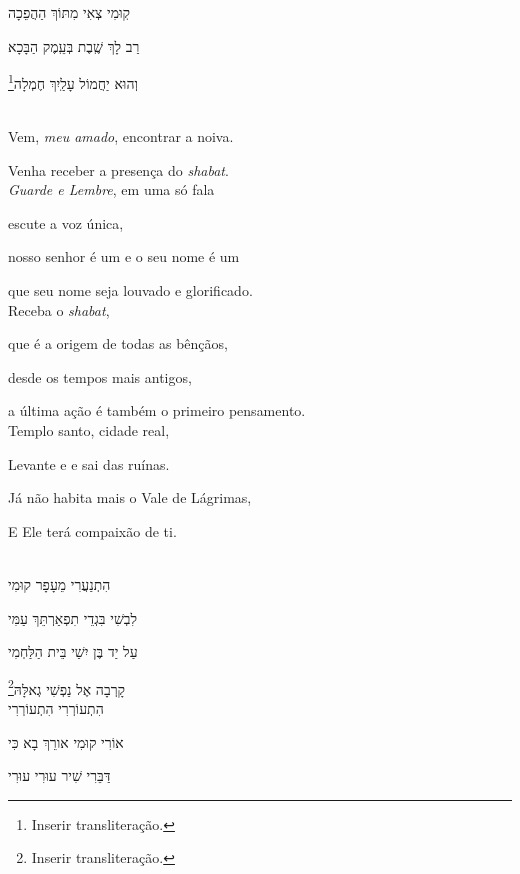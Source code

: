 קֽוּמִי צְאִי מִתּוֹךְ הַהֲפֵכָה

רַב לָךְ שֶֽׁבֶת בְּעֵֽמֶק הַבָּכָא

וְהוּא יַחֲמוֹל עָלַֽיִךְ חֶמְלָה\footnote{Inserir transliteração.}\\[10pt]


\movetooddpage
\raggedright

\vspace*{1cm}

\textsc{}\\[15pt]

Vem, \emph{meu amado}, encontrar a noiva.

Venha receber a presença do \emph{shabat}.\\[10pt]

\emph{Guarde e Lembre}, em uma só fala

escute a voz única,

nosso senhor é um e o seu nome é um

que seu nome seja louvado e glorificado.\\[10pt]

Receba o \emph{shabat},

que é a origem de todas as bênçãos,

desde os tempos mais antigos,

a última ação é também o primeiro pensamento.\\[10pt]

Templo santo, cidade real,

Levante e e sai das ruínas.

Já não habita mais o Vale de Lágrimas,

E Ele terá compaixão de ti.\\[10pt]


\movetoevenpage
\raggedleft

\vspace*{1cm}

\textsc{}\\[15pt]


הִתְנַעֲרִי מֵעָפָר קוּמִי

לִבְשִׁי בִּגְדֵי תִפְאַרְתֵּךְ עַמִּי

עַל יַד בֶּן יִשַׁי בֵּית הַלַּחְמִי

קָרְבָה אֶל נַפְשִׁי גְאלָּהּ\footnote{Inserir transliteração.}\\[10pt]

הִתְעוֹרְרִי הִתְעוֹרְרִי

אוֹרִי קוּמִי אורֵךְ בָא כִּי

דַּבֵּרִי שִׁיר עוּרִי עוּרִי

